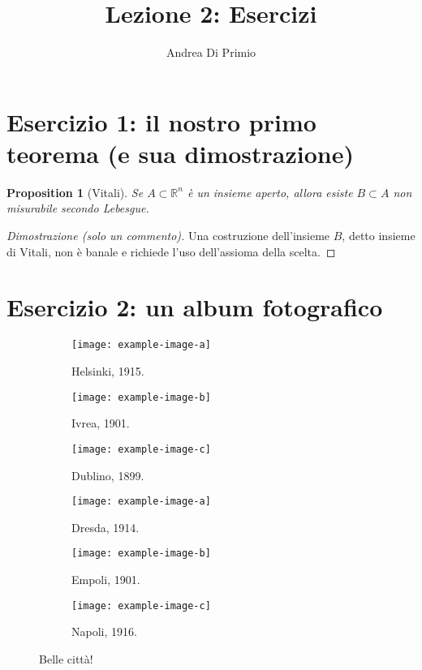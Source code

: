 \documentclass[10pt,a4paper]{article}
\author{Andrea Di Primio}
\title{Lezione 2: Esercizi}
\newtheorem{prop}{Proposition}[section]
\begin{document}
	\maketitle
\section{Esercizio 1: il nostro primo teorema (e sua dimostrazione)}
\begin{prop}[Vitali]
	Se $A \subset \mathbb{R}^n$ è un insieme aperto, allora esiste $B \subset A$ non misurabile secondo Lebesgue.
\end{prop}
\begin{proof}[Dimostrazione (solo un commento)]
	Una costruzione dell'insieme $B$, detto insieme di Vitali, non è banale e richiede l'uso dell'assioma della scelta.
\end{proof}

\section{Esercizio 2: un album fotografico}
\begin{figure}[H]
	\begin{subfigure}[t]{0.3\textwidth}
		\texttt{[image: example-image-a]}
		\caption{Helsinki, 1915.}
	\end{subfigure} \hfill
	\begin{subfigure}[t]{0.3\textwidth}
		\texttt{[image: example-image-b]}
		\caption{Ivrea, 1901.}
	\end{subfigure} \hfill
	\begin{subfigure}[t]{0.3\textwidth}
		\texttt{[image: example-image-c]}
		\caption{Dublino, 1899.}
	\end{subfigure}
	\begin{subfigure}[t]{0.3\textwidth}
		\texttt{[image: example-image-a]}
		\caption{Dresda, 1914.}
	\end{subfigure} \hfill
	\begin{subfigure}[t]{0.3\textwidth}
		\texttt{[image: example-image-b]}
		\caption{Empoli, 1901.}
	\end{subfigure} \hfill
	\begin{subfigure}[t]{0.3\textwidth}
		\texttt{[image: example-image-c]}
		\caption{Napoli, 1916.}
	\end{subfigure}
	\caption{Belle città!}
\end{figure}
\end{document}
